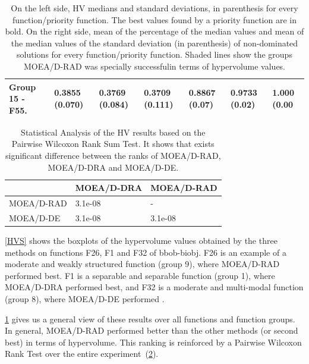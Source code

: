 \begin{center}
\begin{table}[!t]
\begin{tabular}{ccccccc}
		\multicolumn{1}{|l|}{Group 15 - F55.}  & \multicolumn{1}{l}{\textbf{0.3855 (0.070)}} & \multicolumn{1}{l}{0.3769 (0.084)} & \multicolumn{1}{l|}{0.3709 (0.111)}  		& \multicolumn{1}{l}{0.8867 (0.07)} & \multicolumn{1}{l}{0.9733 (0.02)} & \multicolumn{1}{l|}{1.000 (0.00} \\ \hline \hline \hline
	\end{tabular}
	\caption{On the left side, HV medians and standard deviations, in parenthesis for every function/priority function. The best values found by a priority function are in bold. On the right side, mean of the percentage of the median values and mean of the median values of the standard deviation (in parenthesis) of non-dominated solutions for every function/priority function. Shaded lines show the groups MOEA/D-RAD was specially successfulin terms of hypervolume values.}
	\label{stats}
\end{table}
\end{center}

\begin{table}[!t]
	\begin{tabular}{lll}
		\hline
		\rowcolor[gray]{.7} \multicolumn{1}{|l|}{\textbf{HV}}  & \multicolumn{1}{|l|}{MOEA/D-DRA} & \multicolumn{1}{l|}{MOEA/D-RAD} \\ \hline \hline \hline
		MOEA/D-RAD                      &  3.1e-08                      & -                                      \\
		\rowcolor[gray]{.95} MOEA/D-DE                      &  3.1e-08                   &  3.1e-08                 \\
	\end{tabular}
	\caption{Statistical Analysis of the HV results based on the Pairwise Wilcoxon Rank Sum Test. It shows that exists significant difference between the ranks of MOEA/D-RAD, MOEA/D-DRA and MOEA/D-DE.}
	\label{statistics}
\end{table}

\ref{HVS} shows the boxplots of the hypervolume values obtained by the three methods
on functions F26, F1 and F32 of bbob-biobj. F26 is an example of a moderate and
weakly structured function (group 9), where MOEA/D-RAD performed best. F1  is a
separable and separable function (group 1), where MOEA/D-DRA performed best, and
F32 is a moderate and multi-modal function (group 8), where MOEA/D-DE performed
.

\ref{stats} gives us a general view of these results over all functions and
function groups. In general, MOEA/D-RAD performed better than the other methods
(or second best) in terms of hypervolume. This ranking is reinforced by a
Pairwise Wilcoxon Rank Test over the entire experiment~(\ref{statistics}).

